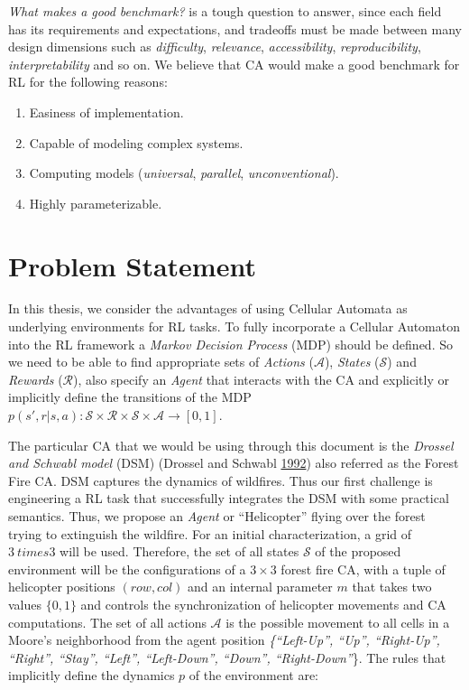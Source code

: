 \documentclass[
  12pt,
  openany]{book}
\providecommand{\tightlist}{%
  \setlength{\itemsep}{0pt}\setlength{\parskip}{0pt}}
\begin{document}
\emph{What makes a good benchmark?} is a tough question to answer, since each field has its requirements and expectations, and tradeoffs must be made between many design dimensions such as \emph{difficulty}, \emph{relevance}, \emph{accessibility}, \emph{reproducibility}, \emph{interpretability} and so on. We believe that CA would make a good benchmark for RL for the following reasons:

\begin{enumerate}
\def\labelenumi{\arabic{enumi}.}
\tightlist
\item
  Easiness of implementation.
\item
  Capable of modeling complex systems.
\item
  Computing models (\emph{universal}, \emph{parallel}, \emph{unconventional}).
\item
  Highly parameterizable.
\end{enumerate}

\hypertarget{problem-statement}{%
\section{Problem Statement}\label{problem-statement}}

In this thesis, we consider the advantages of using Cellular Automata as underlying environments for RL tasks. To fully incorporate a Cellular Automaton into the RL framework a \emph{Markov Decision Process} (MDP) should be defined. So we need to be able to find appropriate sets of \emph{Actions} (\(\mathcal{A}\)), \emph{States} (\(\mathcal{S}\)) and \emph{Rewards} (\(\mathcal{R}\)), also specify an \emph{Agent} that interacts with the CA and explicitly or implicitly define the transitions of the MDP \(p(s',r|s,a): \mathcal{S} \times \mathcal{R} \times \mathcal{S} \times \mathcal{A} \rightarrow [0,1]\).

The particular CA that we would be using through this document is the \emph{Drossel and Schwabl model} (DSM) (Drossel and Schwabl \protect\hyperlink{ref-drossel1992self}{1992}) also referred as the Forest Fire CA. DSM captures the dynamics of wildfires. Thus our first challenge is engineering a RL task that successfully integrates the DSM with some practical semantics. Thus, we propose an \emph{Agent} or ``Helicopter'' flying over the forest trying to extinguish the wildfire. For an initial characterization, a grid of \(3 \ times 3\) will be used. Therefore, the set of all states \(\mathcal{S}\) of the proposed environment will be the configurations of a \(3 \times 3\) forest fire CA, with a tuple of helicopter positions \((row,col)\) and an internal parameter \(m\) that takes two values \(\{0, 1\}\) and controls the synchronization of helicopter movements and CA computations. The set of all actions \(\mathcal{A}\) is the possible movement to all cells in a Moore's neighborhood from the agent position \emph{\{``Left-Up'', ``Up'', ``Right-Up'', ``Right'', ``Stay'', ``Left'', ``Left-Down'', ``Down'', ``Right-Down''}\}. The rules that implicitly define the dynamics \(p\) of the environment are:
\end{document}

